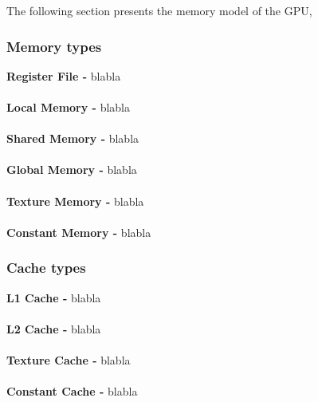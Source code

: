 
The following section presents the memory model of the GPU, 

\subsubsection{Memory types}
\textbf{Register File -} blabla
\\\\
\textbf{Local Memory -} blabla
\\\\
\textbf{Shared Memory -} blabla
\\\\
\textbf{Global Memory -} blabla
\\\\
\textbf{Texture Memory -} blabla
\\\\
\textbf{Constant Memory -} blabla


\subsubsection{Cache types}
\textbf{L1 Cache -} blabla
\\\\
\textbf{L2 Cache -} blabla
\\\\
\textbf{Texture Cache -} blabla
\\\\
\textbf{Constant Cache -} blabla

